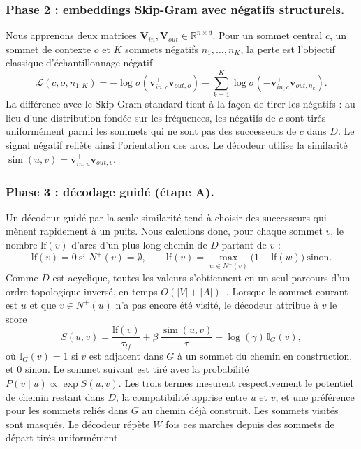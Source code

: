 \documentclass{llncs}
\begin{document}
\subsubsection{Phase 2 : embeddings Skip-Gram avec négatifs structurels.}
Nous apprenons deux matrices $\mathbf{V}_{in},\mathbf{V}_{out}\in\mathbb{R}^{n\times d}$. Pour un sommet central $c$, un sommet de contexte $o$ et $K$ sommets négatifs $n_1,\ldots,n_K$, la perte est l'objectif classique d'échantillonnage négatif
\begin{equation}
\mathcal{L}(c,o,n_{1:K}) = -\log\sigma(\mathbf{v}_{in,c}^{\top}\mathbf{v}_{out,o}) - \sum_{k=1}^{K}\log\sigma(-\mathbf{v}_{in,c}^{\top}\mathbf{v}_{out,n_k}).
\end{equation}
La différence avec le Skip-Gram standard tient à la façon de tirer les négatifs : au lieu d'une distribution fondée sur les fréquences, les négatifs de $c$ sont tirés uniformément parmi les sommets qui ne sont pas des successeurs de $c$ dans $D$. Le signal négatif reflète ainsi l'orientation des arcs. Le décodeur utilise la similarité $\operatorname{sim}(u,v)=\mathbf{v}_{in,u}^{\top}\mathbf{v}_{out,v}$.

\subsubsection{Phase 3 : décodage guidé (étape A).}
Un décodeur guidé par la seule similarité tend à choisir des successeurs qui mènent rapidement à un puits. Nous calculons donc, pour chaque sommet $v$, le nombre $\mathrm{lf}(v)$ d'arcs d'un plus long chemin de $D$ partant de $v$ :
\begin{equation}
\mathrm{lf}(v) = 0 \ \text{si } N^+(v)=\emptyset, \qquad \mathrm{lf}(v)=\max_{w\in N^+(v)}\bigl(1+\mathrm{lf}(w)\bigr) \ \text{sinon}.
\end{equation}
Comme $D$ est acyclique, toutes les valeurs s'obtiennent en un seul parcours d'un ordre topologique inversé, en temps $O(|V|+|A|)$~\cite{bellman1958}. Lorsque le sommet courant est $u$ et que $v\in N^+(u)$ n'a pas encore été visité, le décodeur attribue à $v$ le score
\begin{equation}
S(u,v) = \frac{\mathrm{lf}(v)}{\tau_{lf}} + \beta\,\frac{\operatorname{sim}(u,v)}{\tau} + \log(\gamma)\,\mathbb{I}_G(v),
\end{equation}
où $\mathbb{I}_G(v)=1$ si $v$ est adjacent dans $G$ à un sommet du chemin en construction, et $0$ sinon. Le sommet suivant est tiré avec la probabilité $P(v\mid u)\propto\exp S(u,v)$. Les trois termes mesurent respectivement le potentiel de chemin restant dans $D$, la compatibilité apprise entre $u$ et $v$, et une préférence pour les sommets reliés dans $G$ au chemin déjà construit. Les sommets visités sont masqués. Le décodeur répète $W$ fois ces marches depuis des sommets de départ tirés uniformément.
\end{document}
